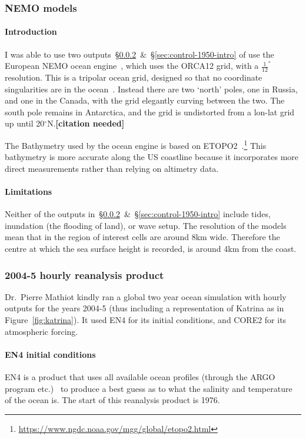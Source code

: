 \subsubsection{NEMO models}
\paragraph{Introduction}
\label{sec:nemo}
I was able to use two outputs~§\ref{sec:rean-prod}~\&~§\ref{sec:control-1950-intro}
of use the European NEMO ocean engine~\cite{madec2015nemo}, which uses the ORCA12 grid, with a  $\frac{1}{12}^{\circ}$
resolution.
This is a tripolar ocean grid, designed so that no coordinate singularities are in the ocean~\cite{madec1996global}.
Instead there are two `north' poles, one in Russia, and one in the Canada,
with the grid elegantly curving between the two.
The south pole remains in Antarctica, and the grid is undistorted from a lon-lat
 grid up until 20$^{\circ}$N.\textbf{[citation needed]}

 The Bathymetry used by the ocean engine is based on
 ETOPO2~\cite{lecointre2011definition,noaa20062}.\footnote{\url{https://www.ngdc.noaa.gov/mgg/global/etopo2.html}}
 This bathymetry is more accurate along the US coastline because it incorporates
 more direct measurements rather than relying on altimetry data.

\paragraph{Limitations}

Neither of the outputs in~§\ref{sec:rean-prod}~\&~§\ref{sec:control-1950-intro}
include tides, inundation (the flooding of land), or wave setup.
The resolution of the models mean that in the region of interest cells are around
8km wide. Therefore the centre at which the sea surface height is recorded,
is around 4km from the coast.

\subsubsection{2004-5 hourly reanalysis product}
\label{sec:rean-prod}
Dr.~Pierre Mathiot kindly ran a global two year ocean simulation with
hourly outputs for the years 2004-5 (thus including a representation of Katrina as
in Figure~\ref{fig:katrina}).
It used EN4 for its initial conditions,
and CORE2 for its atmospheric forcing.

\paragraph{EN4 initial conditions}
EN4 is a product that uses all available ocean profiles
(through the ARGO program etc.)~\cite{good2013en4, HadObs}
to produce a best guess as to what the salinity and temperature of the ocean is.
 The start of this reanalysis product is 1976.


